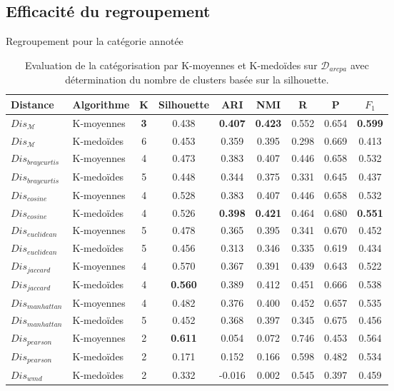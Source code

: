 \subsection{Efficacité du regroupement}
\begin{frame}{Regroupement pour la catégorie annotée}
	\begin{table}[!htb]
		\centering \tiny
		\begin{tabular}[pos]{|l|l|c|c|c|c|c|c|c|}
			\hline
			{Distance}& {Algorithme}& {K}& {Silhouette}& {ARI} & {NMI} & {R} & {P} & ${F_1}$ \\ \hline
			$Dis_\mathcal{M}$          & K-moyennes    & \textbf{3} & 0.438      & \textbf{0.407} & \textbf{0.423} & 0.552  & 0.654     & \textbf{0.599} \\ \hline
			$Dis_\mathcal{M}$          & K-medoïdes  & 6 & 0.453      & 0.359 & 0.395 & 0.298  & 0.669     & 0.413 \\ \hline
			$Dis_{braycurtis}$ & K-moyennes    & 4 & 0.473      & 0.383 & 0.407 & 0.446  & 0.658     & 0.532 \\ \hline
			$Dis_{braycurtis}$ & K-medoïdes  & 5 & 0.448      & 0.344 & 0.375 & 0.331  & 0.645     & 0.437 \\ \hline
			$Dis_{cosine}$     & K-moyennes    & 4 & 0.528      & 0.383 & 0.407 & 0.446  & 0.658     & 0.532 \\ \hline
			$Dis_{cosine}$     & K-medoïdes  & 4 & 0.526      & \textbf{0.398} & \textbf{0.421} & 0.464  & 0.680     & \textbf{0.551} \\ \hline
			$Dis_{euclidean}$  & K-moyennes    & 5 & 0.478      & 0.365 & 0.395 & 0.341  & 0.670     & 0.452 \\ \hline
			$Dis_{euclidean}$  & K-medoïdes  & 5 & 0.456      & 0.313 & 0.346 & 0.335  & 0.619     & 0.434 \\ \hline
			$Dis_{jaccard}$    & K-moyennes    & 4 & 0.570      & 0.367 & 0.391 & 0.439  & 0.643     & 0.522 \\ \hline
			$Dis_{jaccard}$    & K-medoïdes  & 4 & \textbf{0.560}      & 0.389 & 0.412 & 0.451  & 0.666     & 0.538 \\ \hline
			$Dis_{manhattan}$  & K-moyennes    & 4 & 0.482      & 0.376 & 0.400 & 0.452  & 0.657     & 0.535 \\ \hline
			$Dis_{manhattan}$  & K-medoïdes  & 5 & 0.452      & 0.368 & 0.397 & 0.345  & 0.675     & 0.456 \\ \hline
			$Dis_{pearson}$    & K-moyennes    & 2 & \textbf{0.611}      & 0.054 & 0.072 & 0.746  & 0.453     & 0.564 \\ \hline
			$Dis_{pearson}$    & K-medoïdes  & 2 & 0.171      & 0.152 & 0.166 & 0.598  & 0.482     & 0.534 \\ \hline
			$Dis_{wmd}$      & K-medoïdes  & 2 & 0.332      & -0.016 & 0.002 & 0.545  & 0.397     & 0.459 \\ \hline
		\end{tabular}
		\caption{Evaluation de la catégorisation par K-moyennes et K-medoïdes sur $\mathcal{D}_{arcpa}$ avec détermination du nombre de clusters basée sur la silhouette.} \label{tab:similarite:validation-supervisee-optKbySilhouette}
	\end{table}
\end{frame}


